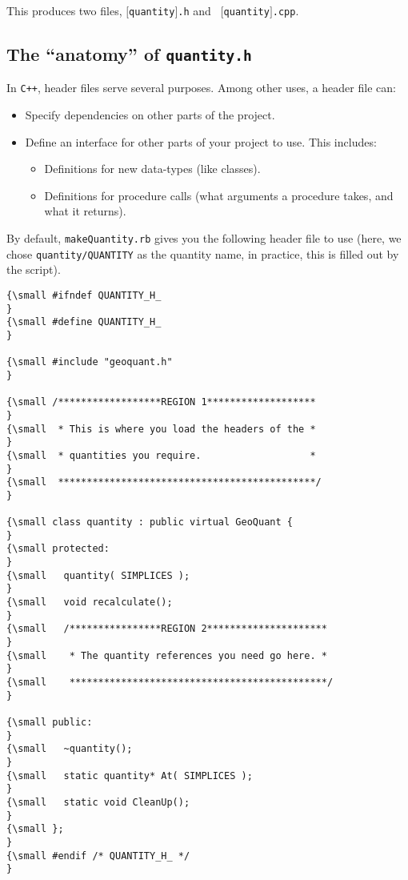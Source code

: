 This produces two files, \texttt{\mbox{$[$}quantity\mbox{$]$}.h} and \texttt{%
\mbox{$[$}quantity\mbox{$]$}.cpp}.

\subsection{The ``anatomy'' of \texttt{quantity.h}}

In \texttt{C++}, header files serve several purposes. Among other uses, a
header file can:

\begin{itemize}
\item Specify dependencies on other parts of the project.

\item Define an interface for other parts of your project to use. This
includes:

\begin{itemize}
\item Definitions for new data-types (like classes).

\item Definitions for procedure calls (what arguments a procedure takes, and
what it returns).
\end{itemize}
\end{itemize}

By default, \texttt{makeQuantity.rb} gives you the following header file to
use (here, we chose \texttt{quantity/QUANTITY} as the quantity name, in
practice, this is filled out by the script). {\small }
\begin{verbatim}
{\small #ifndef QUANTITY_H_
}
{\small #define QUANTITY_H_
}
 
{\small #include "geoquant.h"
}
 
{\small /******************REGION 1*******************
}
{\small  * This is where you load the headers of the *
}
{\small  * quantities you require.                   *
}
{\small  *********************************************/
}
 
{\small class quantity : public virtual GeoQuant {
}
{\small protected:
}
{\small   quantity( SIMPLICES );
}
{\small   void recalculate();
}
{\small   /****************REGION 2*********************
}
{\small    * The quantity references you need go here. *
}
{\small    *********************************************/
}
 
{\small public:
}
{\small   ~quantity();
}
{\small   static quantity* At( SIMPLICES );
}
{\small   static void CleanUp();
}
{\small };
}
{\small #endif /* QUANTITY_H_ */
}
\end{verbatim}

